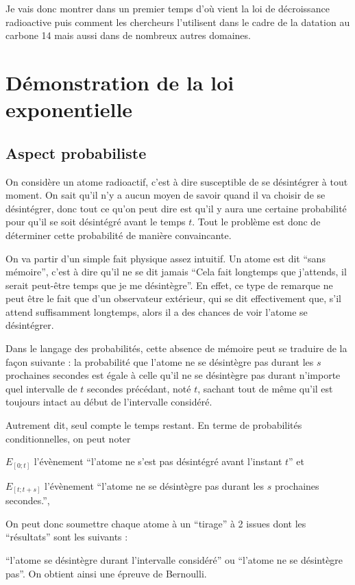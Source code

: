 \documentclass[a4paper,10pt,french]{scrartcl}
\begin{document}
Je vais donc montrer dans un premier temps d'où vient la loi de décroissance radioactive puis comment les chercheurs l'utilisent dans le cadre de la datation au carbone 14 mais aussi dans de nombreux autres domaines.



\section{Démonstration de la loi exponentielle}
\subsection{Aspect probabiliste}
On considère un atome radioactif, c'est à dire susceptible de se désintégrer à tout moment. On sait qu'il n'y a aucun moyen de savoir quand il va choisir de se désintégrer, donc tout ce qu'on peut dire est qu'il y aura une certaine probabilité pour qu'il se soit désintégré avant le temps $t$. Tout le problème est donc de déterminer cette probabilité de manière convaincante.


On va partir d'un simple fait physique assez intuitif. Un atome est dit ``sans mémoire'', c'est à dire qu'il ne se dit jamais ``Cela fait longtemps que j'attends, il serait peut-être temps que je me désintègre''. En effet, ce type de remarque ne peut être le fait que d'un observateur extérieur, qui se dit effectivement que, s'il attend suffisamment longtemps, alors il a des chances de voir l'atome se désintégrer.

Dans le langage des probabilités, cette absence de mémoire peut se traduire de la façon suivante : la probabilité que l'atome ne se désintègre pas durant les $s$ prochaines secondes est égale à celle qu'il ne se désintègre pas durant n'importe quel intervalle de $t$ secondes précédant, noté $t$, sachant tout de même qu'il est toujours intact au début de l'intervalle considéré.

Autrement dit, seul compte le temps restant. En terme de probabilités conditionnelles, on peut noter

$E_{[0;t]}$ l'évènement ``l'atome ne s'est pas désintégré avant l'instant $t$'' et

$E_{[t;t+s]}$ l'évènement ``l'atome ne se désintègre pas durant les $s$ prochaines secondes.'',

On peut  donc soumettre chaque atome à un “tirage” à 2 issues dont les “résultats” sont les suivants :

“l’atome se désintègre durant l'intervalle considéré” ou
“l’atome ne se désintègre pas”.
On obtient ainsi une épreuve de Bernoulli.
\end{document}
